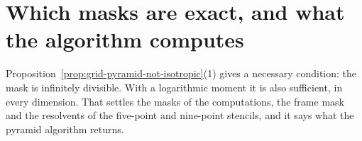 \section{Which masks are exact, and what the algorithm computes}
\label{sec:price-masks}

Proposition~\ref{prop:grid-pyramid-not-isotropic}(1) gives a necessary condition: the mask is
infinitely divisible. With a logarithmic moment it is also sufficient, in every dimension. That
settles the masks of the computations, the frame mask and the resolvents of the five-point and
nine-point stencils, and it says what the pyramid algorithm returns.

